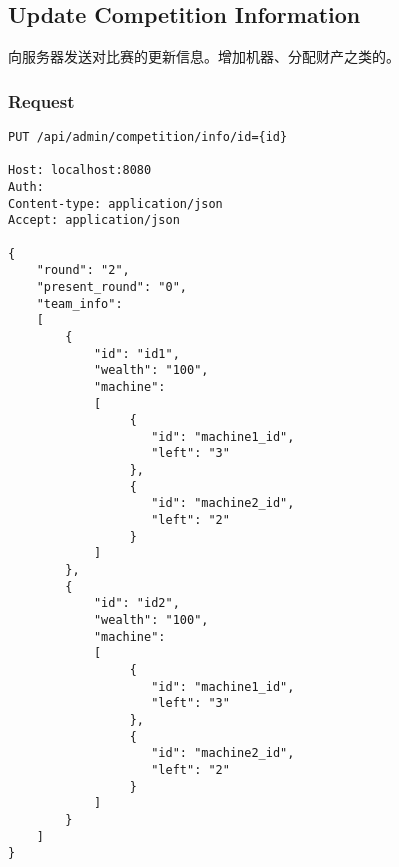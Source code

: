 \documentclass{article}
\begin{document}
\subsection{Update Competition Information}
向服务器发送对比赛的更新信息。增加机器、分配财产之类的。

\subsubsection*{Request}
\begin{lstlisting}
PUT /api/admin/competition/info/id={id}

Host: localhost:8080
Auth:
Content-type: application/json
Accept: application/json

{
    "round": "2",
    "present_round": "0",
    "team_info":
    [
        {
            "id": "id1",
            "wealth": "100",
            "machine":
            [
                 {
                    "id": "machine1_id",
                    "left": "3"
                 },
                 {
                    "id": "machine2_id",
                    "left": "2"
                 }
            ]
        },
        {
            "id": "id2",
            "wealth": "100",
            "machine":
            [
                 {
                    "id": "machine1_id",
                    "left": "3"
                 },
                 {
                    "id": "machine2_id",
                    "left": "2"
                 }
            ]
        }
    ]
}
\end{lstlisting}
\end{document}
